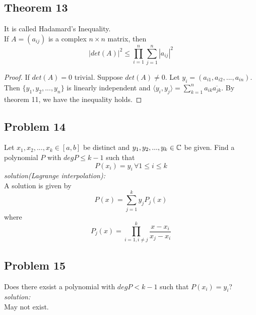 \documentclass{article}
\begin{document}
\subsection*{Theorem 13}
It is called Hadamard's Inequality.\\
If $A=(a_{ij})$ is a complex $n\times n$ matrix, then 
\[
|det(A)|^2\leq\prod_{i=1}^{n}\sum_{j=1}^{n}|a_{ij}|^2
\]
\begin{proof}
If $det(A)=0$ trivial. Suppose $det(A)\neq 0 $. Let $y_i = (a_{i1},a_{i2},...,a_{in})$. Then $\{y_1,y_2,...,y_n\}$ is linearly independent and $\langle y_i, y_j \rangle = \sum_{k=1}^{n} a_{ik}\overline{a_{jk}}$. By theorem 11, we have the inequality holds.
\end{proof}

\subsection*{Problem 14}
Let $x_1,x_2,...,x_k\in [a,b]$ be distinct and $y_1,y_2,...,y_k\in\Bbb{C}$ be given. Find a polynomial $P$ with $deg P \leq k-1$ such that
\[
P(x_i)=y_i \, \forall 1\leq i\leq k
\]
\emph{solution(Lagrange interpolation):}\\
A solution is given by
\[
P(x)=\sum_{j=1}^{k}y_jP_j(x)
\]
where 
\[
P_j(x)=\prod_{i=1,i\neq j}^{k}\frac{x-x_i}{x_j-x_i}
\]

\subsection*{Problem 15}
Does there exsist a polynomial with $deg P<k-1$ such that $P(x_i)=y_i$?\\
\emph{solution:}\\
May not exist.
\end{document}
